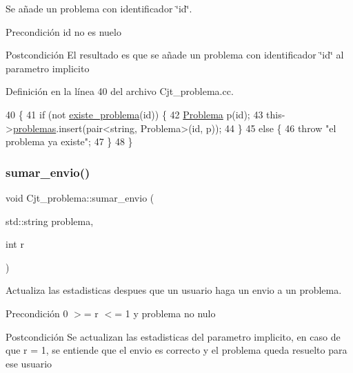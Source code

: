 Se añade un problema con identificador \char`\"{}id\char`\"{}. 

\begin{DoxyPrecond}{Precondición}
id no es nuelo 
\end{DoxyPrecond}
\begin{DoxyPostcond}{Postcondición}
El resultado es que se añade un problema con identificador \char`\"{}id\char`\"{} al parametro implicito 
\end{DoxyPostcond}


Definición en la línea 40 del archivo Cjt\+\_\+problema.\+cc.


\begin{DoxyCode}
40                                             \{
41   \textcolor{keywordflow}{if} (not \mbox{\hyperlink{class_cjt__problema_a831be5b51e252520ee981b58d9ec00e9}{existe\_problema}}(\textcolor{keywordtype}{id})) \{
42     \mbox{\hyperlink{class_problema}{Problema}} p(\textcolor{keywordtype}{id});
43     this->\mbox{\hyperlink{class_cjt__problema_a2d471986320805c5b27f8d14d486fca8}{problemas}}.insert(pair<string, Problema>(\textcolor{keywordtype}{id}, p));
44   \}
45   \textcolor{keywordflow}{else} \{
46     \textcolor{keywordflow}{throw} \textcolor{stringliteral}{"el problema ya existe"};
47   \}
48 \}
\end{DoxyCode}
\mbox{\label{class_cjt__problema_a5450799b75298f2b267f3ecce7ba5fb0}} 
\subsubsection{\texorpdfstring{sumar\+\_\+envio()}{sumar\_envio()}}
{\footnotesize\ttfamily void Cjt\+\_\+problema\+::sumar\+\_\+envio (\begin{DoxyParamCaption}\item[{std\+::string}]{problema,  }\item[{int}]{r }\end{DoxyParamCaption})}



Actualiza las estadisticas despues que un usuario haga un envio a un problema. 

\begin{DoxyPrecond}{Precondición}
0 $>$= r $<$= 1 y problema no nulo 
\end{DoxyPrecond}
\begin{DoxyPostcond}{Postcondición}
Se actualizan las estadisticas del parametro implicito, en caso de que r = 1, se entiende que el envio es correcto y el problema queda resuelto para ese usuario 
\end{DoxyPostcond}


